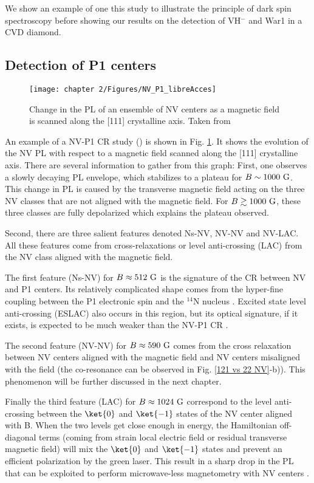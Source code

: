 \documentclass[a4paper, 11pt]{book}
\begin{document}
We show an example of one this study to illustrate the principle of dark spin spectroscopy before showing our results on the detection of VH$^-$ and War1 in a CVD diamond.

\subsection{Detection of P1 centers}

\begin{figure}[h]
\centering
\texttt{[image: chapter 2/Figures/NV\_P1\_libreAcces]}
\caption{Change in the PL of an ensemble of NV centers as a magnetic field is scanned along the [111] crystalline axis. Taken from \citep{armstrong2010nv}}
\label{CR P1 exp}
\end{figure}

An example of a NV-P1 CR study (\citep{armstrong2010nv}) is shown in Fig. \ref{CR P1 exp}. It shows the evolution of the NV PL with respect to a magnetic field scanned along the [111] crystalline axis. There are several information to gather from this graph: First, one observes a slowly decaying PL envelope, which stabilizes to a plateau for $B\sim 1000\ \rm G$. This change in PL is caused by the transverse magnetic field acting on the three NV classes that are not aligned with the magnetic field. For $B \gtrsim 1000\ \rm G$, these three classes are fully depolarized which explains the plateau observed.

Second, there are three salient features denoted Ns-NV, NV-NV and NV-LAC. All these features come from cross-relaxations or level anti-crossing (LAC) from the NV class aligned with the magnetic field.

The first feature (Ns-NV) for $B\approx 512 \ \rm G$ is the signature of the CR between NV and P1 centers. Its relatively complicated shape comes from the hyper-fine coupling between the P1 electronic spin and the $^{14}$N nucleus \citep{lazda2021cross}. Excited state level anti-crossing (ESLAC) also occurs in this region, but its optical signature, if it exists, is expected to be much weaker than the NV-P1 CR \citep{zheng2017level}.

The second feature (NV-NV) for $B\approx 590 \ \rm G$ comes from the cross relaxation between NV centers aligned with the magnetic field and NV centers misaligned with the field (the co-resonance can be observed in Fig. \ref{121 vs 22 NV}-b)). This phenomenon will be further discussed in the next chapter.

Finally the third feature (LAC) for $B\approx 1024 \ \rm G$ correspond to the level anti-crossing between the $\ket{0}$ and $\ket{-1}$ states of the NV center aligned with B. When the two levels get close enough in energy, the Hamiltonian off-diagonal terms (coming from strain local electric field or residual transverse magnetic field) will mix the $\ket{0}$ and $\ket{-1}$ states and prevent an efficient polarization by the green laser. This result in a sharp drop in the PL that can be exploited to perform microwave-less magnetometry with NV centers \citep{wickenbrock2016microwave, zheng2017level, zheng2020microwave}.
\end{document}
